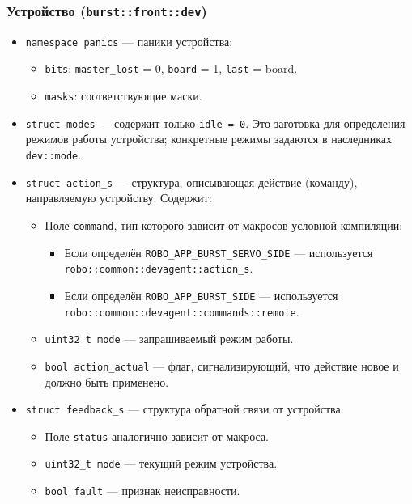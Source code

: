 \documentclass[a4paper,12pt]{article}
\begin{document}
\subsubsection{Устройство (\texttt{burst::front::dev})}

\begin{itemize}
    \item \texttt{namespace panics} — паники устройства:
        \begin{itemize}
            \item \texttt{bits}: \texttt{master\_lost} = 0, \texttt{board} = 1, \texttt{last} = board.
            \item \texttt{masks}: соответствующие маски.
        \end{itemize}
    \item \texttt{struct modes} — содержит только \texttt{idle = 0}. Это заготовка для определения режимов работы устройства; конкретные режимы задаются в наследниках \texttt{dev::mode}.
    \item \texttt{struct action\_s} — структура, описывающая действие (команду), направляемую устройству. Содержит:
        \begin{itemize}
            \item Поле \texttt{command}, тип которого зависит от макросов условной компиляции:
                \begin{itemize}
                    \item Если определён \texttt{ROBO\_APP\_BURST\_SERVO\_SIDE} — используется \texttt{robo::common::devagent::action\_s}.
                    \item Если определён \texttt{ROBO\_APP\_BURST\_SIDE} — используется \texttt{robo::common::devagent::commands::remote}.
                \end{itemize}
            \item \texttt{uint32\_t mode} — запрашиваемый режим работы.
            \item \texttt{bool action\_actual} — флаг, сигнализирующий, что действие новое и должно быть применено.
        \end{itemize}
    \item \texttt{struct feedback\_s} — структура обратной связи от устройства:
        \begin{itemize}
            \item Поле \texttt{status} аналогично зависит от макроса.
            \item \texttt{uint32\_t mode} — текущий режим устройства.
            \item \texttt{bool fault} — признак неисправности.
        \end{itemize}
\end{itemize}
\end{document}
